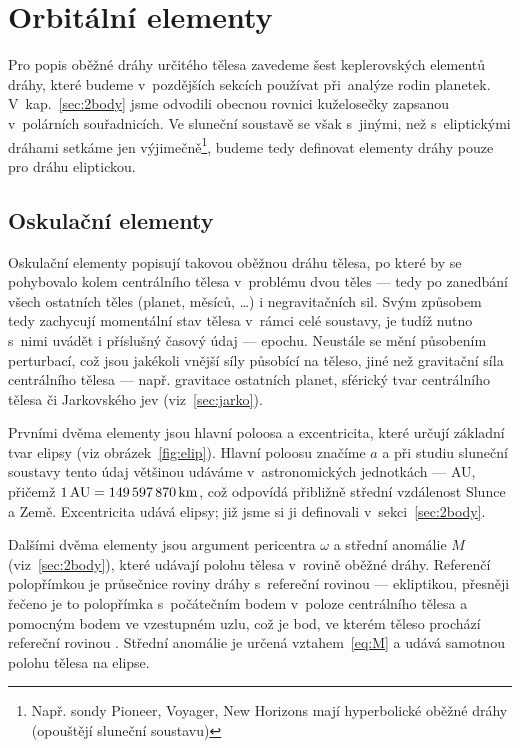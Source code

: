 \documentclass[A4paper, 12pt, oneside]{book}
\begin{document}
\section{Orbitální elementy} \label{sec:orbelem}
Pro popis oběžné dráhy určitého tělesa zavedeme šest keplerovských elementů dráhy, které budeme v~pozdějších sekcích používat při~analýze rodin planetek. V~kap.~\ref{sec:2body} jsme odvodili obecnou rovnici kuželosečky zapsanou v~polárních souřadnicích. Ve sluneční soustavě se však s~jinými, než s~eliptickými dráhami setkáme jen výjimečně\footnote{Např. sondy Pioneer, Voyager, New Horizons mají hyperbolické oběžné dráhy (opouštějí sluneční soustavu)}, budeme tedy definovat elementy dráhy pouze pro dráhu eliptickou.
\subsection{Oskulační elementy}
Oskulační elementy popisují takovou oběžnou dráhu tělesa, po které by se pohybovalo kolem centrálního tělesa v~problému dvou těles --- tedy po zanedbání všech ostatních těles (planet, měsíců, \ldots) i negravitačních sil. Svým způsobem tedy zachycují momentální stav tělesa v~rámci celé soustavy, je tudíž nutno s~nimi uvádět i příslušný časový údaj --- epochu. Neustále se mění působením perturbací, což jsou jakékoli vnější síly působící na těleso, jiné než gravitační síla centrálního tělesa --- např. gravitace ostatních planet, sférický tvar centrálního tělesa či Jarkovského jev (viz~\ref{sec:jarko}).

Prvními dvěma elementy jsou hlavní poloosa a excentricita, které určují základní tvar elipsy (viz obrázek~\ref{fig:elip}). Hlavní poloosu značíme $a$ a při studiu sluneční soustavy tento údaj většinou udáváme v~astronomických jednotkách --- AU, přičemž $1\, {\rm AU} = 149\,597\,870\,{\rm km}$, což odpovídá přibližně střední vzdálenost Slunce a Země. Excentricita udává  elipsy; již jsme si ji definovali v~sekci~\ref{sec:2body}.

Dalšími dvěma elementy jsou argument pericentra $\omega$ a střední anomálie $M$ (viz~\ref{sec:2body}), které udávají polohu tělesa v~rovině oběžné dráhy. Referenčí polopřímkou je průsečnice roviny dráhy s~refereční rovinou --- ekliptikou, přesněji řečeno je to polopřímka s~počátečním bodem v~poloze centrálního tělesa a pomocným bodem ve vzestupném uzlu, což je bod, ve kterém těleso prochází refereční rovinou . Střední anomálie je určená vztahem~\eqref{eq:M} a udává samotnou polohu tělesa na elipse.
\end{document}
